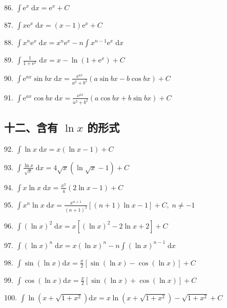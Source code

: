 86. \(\int {\mathrm{e}}^{x}\mathrm{\;d}x = {\mathrm{e}}^{x} + C\)

87. \(\int x{\mathrm{e}}^{x}\mathrm{\;d}x = \left( {x - 1}\right) {\mathrm{e}}^{x} + C\)

88. \(\int {x}^{n}{\mathrm{e}}^{x}\mathrm{\;d}x = {x}^{n}{\mathrm{e}}^{x} - n\int {x}^{n - 1}{\mathrm{e}}^{x}\mathrm{\;d}x\)

89. \(\int \frac{1}{1 + {\mathrm{e}}^{x}}\mathrm{\;d}x = x - \ln \left( {1 + {\mathrm{e}}^{x}}\right)  + C\)

90. \(\int {\mathrm{e}}^{ax}\sin {bx}\mathrm{\;d}x = \frac{{\mathrm{e}}^{ax}}{{a}^{2} + {b}^{2}}\left( {a\sin {bx} - b\cos {bx}}\right)  + C\)

91. \(\int {\mathrm{e}}^{ax}\cos {bx}\mathrm{\;d}x = \frac{{\mathrm{e}}^{ax}}{{a}^{2} + {b}^{2}}\left( {a\cos {bx} + b\sin {bx}}\right)  + C\)

\subsection{十二、含有 \(\ln x\) 的形式}

92. \(\int \ln x\mathrm{\;d}x = x\left( {\ln x - 1}\right)  + C\)

93. \(\int \frac{\ln x}{\sqrt{x}}\mathrm{\;d}x = 4\sqrt{x}\left( {\ln \sqrt{x} - 1}\right)  + C\)

94. \(\int x\ln x\mathrm{\;d}x = \frac{{x}^{2}}{4}\left( {2\ln x - 1}\right)  + C\)

95. \(\int {x}^{n}\ln x\mathrm{\;d}x = \frac{{x}^{n + 1}}{{\left( n + 1\right) }^{2}}\left\lbrack  {\left( {n + 1}\right) \ln x - 1}\right\rbrack   + C,\;n \neq   - 1\)

96. \(\int {\left( \ln x\right) }^{2}\mathrm{\;d}x = x\left\lbrack  {{\left( \ln x\right) }^{2} - 2\ln x + 2}\right\rbrack   + C\)

97. \(\int {\left( \ln x\right) }^{n}\mathrm{\;d}x = x{\left( \ln x\right) }^{n} - n\int {\left( \ln x\right) }^{n - 1}\mathrm{\;d}x\)

98. \(\int \sin \left( {\ln x}\right) \mathrm{d}x = \frac{x}{2}\left\lbrack  {\sin \left( {\ln x}\right)  - \cos \left( {\ln x}\right) }\right\rbrack   + C\)

99. \(\int \cos \left( {\ln x}\right) \mathrm{d}x = \frac{x}{2}\left\lbrack  {\sin \left( {\ln x}\right)  + \cos \left( {\ln x}\right) }\right\rbrack   + C\)

100. \(\int \ln \left( {x + \sqrt{1 + {x}^{2}}}\right) \mathrm{d}x = x\ln \left( {x + \sqrt{1 + {x}^{2}}}\right)  - \sqrt{1 + {x}^{2}} + C\)



